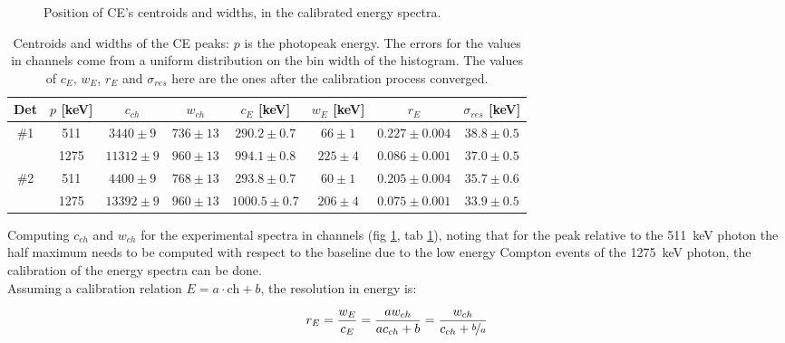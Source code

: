 \documentclass[11pt,a4 paper]{article}
\let\oldfrac\frac
\renewcommand{\frac}[3][d]{\ifthenelse{\equal{#1}{d}}{\oldfrac{#2}{#3}}{\nicefrac{#2}{#3}}}
\begin{document}
\begin{figure}[H]
    \centering
    \caption{Position of CE's centroids and widths, in the calibrated energy spectra.}
    \label{fig:det12:calibr}
\end{figure}

\begin{table}[H]
  \centering
  \begin{tabular}{cccccccc}
    \toprule
    Det & $p$ [keV] & $c_{ch}$ & $w_{ch}$ & $c_E$ [keV] & $w_E$ [keV] & $r_E$ & $\sigma_{res}$ [keV]\\
    \midrule
    \#1 & 511 & $3440 \pm 9$ & $736 \pm 13$ & $290.2 \pm 0.7$ & $66 \pm 1$ & $0.227 \pm 0.004$ & $38.8 \pm 0.5$ \\
        & 1275 & $11312 \pm 9$ & $960 \pm 13$ & $994.1 \pm 0.8$ & $225 \pm 4$ & $0.086 \pm 0.001$ & $37.0 \pm 0.5$ \\
    \#2 & 511 & $4400 \pm 9$ & $768 \pm 13$ & $293.8 \pm 0.7$ & $60 \pm 1$ & $0.205 \pm 0.004$ & $35.7 \pm 0.6$ \\
        & 1275 & $13392 \pm 9$ & $960 \pm 13$ & $1000.5 \pm 0.7$ & $206 \pm 4$ & $0.075 \pm 0.001$ & $33.9 \pm 0.5$ \\
    \bottomrule
  \end{tabular}
  \caption{Centroids and widths of the CE peaks: $p$ is the photopeak energy. The errors for the values in channels come from a uniform distribution on the bin width of the histogram. The values of $c_E$, $w_E$, $r_E$ and $\sigma_{res}$ here are the ones after the calibration process converged.}
  \label{tab:calibr:fits}
\end{table}

Computing $c_{ch}$ and $w_{ch}$ for the experimental spectra in channels (fig \ref{fig:det12:calibr}, tab \ref{tab:calibr:fits}), noting that for the peak relative to the \SI{511}{\kilo\electronvolt} photon the half maximum needs to be computed with respect to the baseline due to the low energy Compton events of the \SI{1275}{\kilo\electronvolt} photon, the calibration of the energy spectra can be done.\\
Assuming a calibration relation $E = a \cdot \text{ch} + b$, the resolution in energy is:

\begin{equation*}
  r_E = \frac{w_E}{c_E} = \frac{a w_{ch}}{a c_{ch} + b} = \frac{w_{ch}}{c_{ch} + \frac[f]{b}{a}}
\end{equation*}
\end{document}
